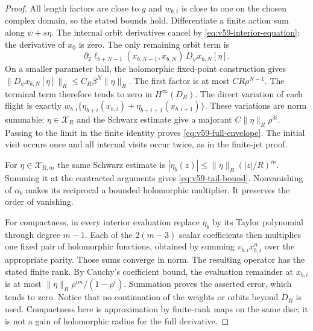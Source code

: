 \begin{proof}
All length factors are close to $g$ and $w_{b,i}$ is close to one on
the chosen complex domain, so the stated bounds hold.  Differentiate a
finite action sum along $\psi+s\eta$.  The internal orbit derivatives
cancel by \eqref{eq:v59-interior-equation}; the derivative of $x_0$ is
zero.  The only remaining orbit term is
\[
 \partial_2\ell_{b+N-1}(x_{b,N-1},x_{b,N})\,
                           D_\psi x_{b,N}[\eta].
\]
On a smaller parameter ball, the holomorphic fixed-point construction
gives $\|D_\psi x_{b,N}[\eta]\|_R\le C_R\beta^N\|\eta\|_R$.
The first factor is at most $CR\rho^{N-1}$.
The terminal term therefore tends to zero in $H^\infty(D_R)$.
The direct variation of each flight is exactly
$w_{b,i}\{\eta_{b+i}(x_{b,i})+
\eta_{b+i+1}(x_{b,i+1})\}$.  These variations are norm summable:
$\eta\in\mathscr X_R$ and the Schwarz estimate give a majorant
$C\|\eta\|_R\rho^{3i}$.  Passing to the limit in the finite
identity proves \eqref{eq:v59-full-envelope}.  The initial visit occurs
once and all internal visits occur twice, as in the finite-jet proof.

For $\eta\in\mathscr X_{R,m}$ the same Schwarz estimate is
$|\eta_b(z)|\le\|\eta\|_R(|z|/R)^m$.  Summing it at the
contracted arguments gives \eqref{eq:v59-tail-bound}.  Nonvanishing
of $\alpha_b$ makes its reciprocal a bounded holomorphic multiplier.
It preserves the order of vanishing.

For compactness, in every interior evaluation replace $\eta_b$ by its
Taylor polynomial through degree $m-1$.  Each of the $2(m-3)$ scalar
coefficients then multiplies one fixed pair of holomorphic functions,
obtained by summing $v_{b,i}x_{b,i}^n$ over the appropriate parity.
Those sums converge in norm.  The resulting operator has the stated
finite rank.  By Cauchy's coefficient bound, the evaluation remainder
at $x_{b,i}$ is at most
$\|\eta\|_R\rho^{im}/(1-\rho^i)$.
Summation proves the asserted error, which tends to zero.  Notice that
no continuation of the weights or orbits beyond $D_R$ is used.
Compactness here is approximation by finite-rank maps on the same disc;
it is not a gain of holomorphic radius for the full derivative.
\end{proof}


